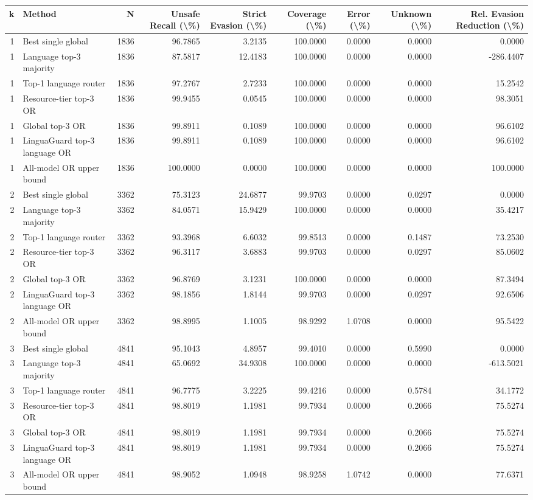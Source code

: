 \begin{tabular}{rlrrrrrrr}
\toprule
k & Method & N & Unsafe Recall (\textbackslash \%) & Strict Evasion (\textbackslash \%) & Coverage (\textbackslash \%) & Error (\textbackslash \%) & Unknown (\textbackslash \%) & Rel. Evasion Reduction (\textbackslash \%) \\
\midrule
1 & Best single global & 1836 & 96.7865 & 3.2135 & 100.0000 & 0.0000 & 0.0000 & 0.0000 \\
1 & Language top-3 majority & 1836 & 87.5817 & 12.4183 & 100.0000 & 0.0000 & 0.0000 & -286.4407 \\
1 & Top-1 language router & 1836 & 97.2767 & 2.7233 & 100.0000 & 0.0000 & 0.0000 & 15.2542 \\
1 & Resource-tier top-3 OR & 1836 & 99.9455 & 0.0545 & 100.0000 & 0.0000 & 0.0000 & 98.3051 \\
1 & Global top-3 OR & 1836 & 99.8911 & 0.1089 & 100.0000 & 0.0000 & 0.0000 & 96.6102 \\
1 & LinguaGuard top-3 language OR & 1836 & 99.8911 & 0.1089 & 100.0000 & 0.0000 & 0.0000 & 96.6102 \\
1 & All-model OR upper bound & 1836 & 100.0000 & 0.0000 & 100.0000 & 0.0000 & 0.0000 & 100.0000 \\
2 & Best single global & 3362 & 75.3123 & 24.6877 & 99.9703 & 0.0000 & 0.0297 & 0.0000 \\
2 & Language top-3 majority & 3362 & 84.0571 & 15.9429 & 100.0000 & 0.0000 & 0.0000 & 35.4217 \\
2 & Top-1 language router & 3362 & 93.3968 & 6.6032 & 99.8513 & 0.0000 & 0.1487 & 73.2530 \\
2 & Resource-tier top-3 OR & 3362 & 96.3117 & 3.6883 & 99.9703 & 0.0000 & 0.0297 & 85.0602 \\
2 & Global top-3 OR & 3362 & 96.8769 & 3.1231 & 100.0000 & 0.0000 & 0.0000 & 87.3494 \\
2 & LinguaGuard top-3 language OR & 3362 & 98.1856 & 1.8144 & 99.9703 & 0.0000 & 0.0297 & 92.6506 \\
2 & All-model OR upper bound & 3362 & 98.8995 & 1.1005 & 98.9292 & 1.0708 & 0.0000 & 95.5422 \\
3 & Best single global & 4841 & 95.1043 & 4.8957 & 99.4010 & 0.0000 & 0.5990 & 0.0000 \\
3 & Language top-3 majority & 4841 & 65.0692 & 34.9308 & 100.0000 & 0.0000 & 0.0000 & -613.5021 \\
3 & Top-1 language router & 4841 & 96.7775 & 3.2225 & 99.4216 & 0.0000 & 0.5784 & 34.1772 \\
3 & Resource-tier top-3 OR & 4841 & 98.8019 & 1.1981 & 99.7934 & 0.0000 & 0.2066 & 75.5274 \\
3 & Global top-3 OR & 4841 & 98.8019 & 1.1981 & 99.7934 & 0.0000 & 0.2066 & 75.5274 \\
3 & LinguaGuard top-3 language OR & 4841 & 98.8019 & 1.1981 & 99.7934 & 0.0000 & 0.2066 & 75.5274 \\
3 & All-model OR upper bound & 4841 & 98.9052 & 1.0948 & 98.9258 & 1.0742 & 0.0000 & 77.6371 \\
\bottomrule
\end{tabular}
